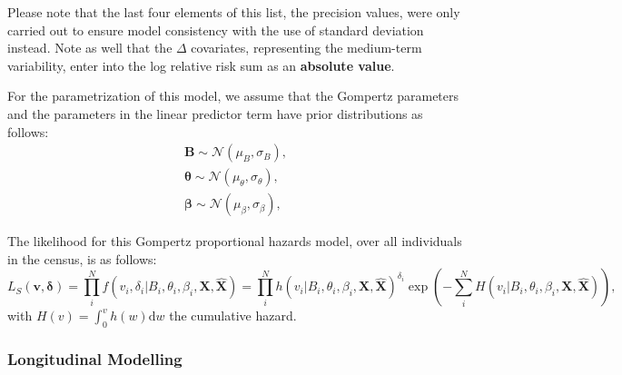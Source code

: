 \documentclass[
]{article}
\begin{document}
Please note that the last four elements of this list, the precision values, were only carried out to ensure model consistency with the use of standard deviation instead.
Note as well that the \(\Delta\) covariates, representing the medium-term variability, enter into the log relative risk sum as an \textbf{absolute value}.

For the parametrization of this model, we assume that the Gompertz parameters and the parameters in the linear predictor term have prior distributions as follows:
\begin{equation}\label{priorsS}
\begin{aligned}
  \boldsymbol{B}\sim\mathcal{N}(\mu_B,\sigma_B),\\
  \boldsymbol{\theta}\sim\mathcal{N}(\mu_\theta,\sigma_\theta),\\
  \boldsymbol{\beta}\sim \mathcal{N}(\mu_\beta,\sigma_\beta),
\end{aligned}
\end{equation}

The likelihood for this Gompertz proportional hazards model, over all individuals in the census, is as follows:
\begin{equation}\label{likesurv}
L_S(\boldsymbol{v},\boldsymbol{\delta})=\prod_i^N f(v_i,\delta_i|B_i,\theta_i,\beta_i,\boldsymbol{X},\hat{\boldsymbol{X}})=\prod_i^N h(v_i|B_i,\theta_i,\beta_i,\boldsymbol{X},\hat{\boldsymbol{X}})^{\delta_i} \exp{\left( -\sum_i^N H(v_i|B_i,\theta_i,\beta_i,\boldsymbol{X},\hat{\boldsymbol{X}}) \right)},
\end{equation}
with \(H(v)=\int_0^v h(w) \mathrm{d}w\) the cumulative hazard.

\hypertarget{longitudinal-modelling}{%
\subsubsection{Longitudinal Modelling}\label{longitudinal-modelling}}
\end{document}
